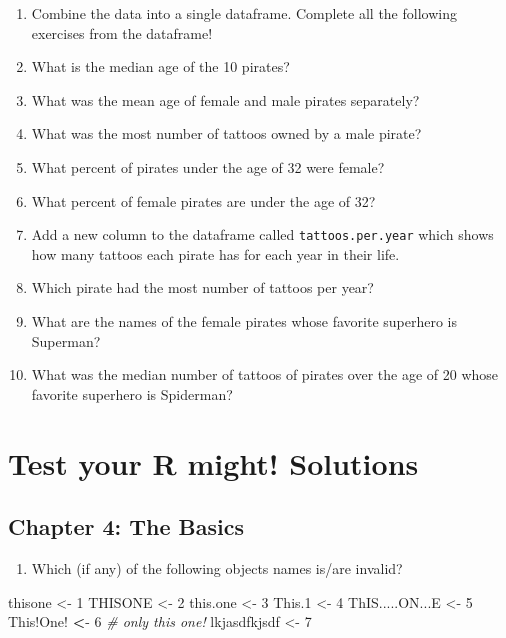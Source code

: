 \documentclass[]{book}
\newenvironment{Shaded}{\begin{snugshade}}{\end{snugshade}}
\newcommand{\DecValTok}[1]{\textcolor[rgb]{0.00,0.00,0.81}{{#1}}}
\newcommand{\FloatTok}[1]{\textcolor[rgb]{0.00,0.00,0.81}{{#1}}}
\newcommand{\StringTok}[1]{\textcolor[rgb]{0.31,0.60,0.02}{{#1}}}
\newcommand{\CommentTok}[1]{\textcolor[rgb]{0.56,0.35,0.01}{\textit{{#1}}}}
\newcommand{\ErrorTok}[1]{\textcolor[rgb]{0.64,0.00,0.00}{\textbf{{#1}}}}
\newcommand{\NormalTok}[1]{{#1}}
\providecommand{\tightlist}{%
  \setlength{\itemsep}{0pt}\setlength{\parskip}{0pt}}
\theoremstyle{definition}
\theoremstyle{definition}
\theoremstyle{remark}
\begin{document}
\begin{enumerate}
\def\labelenumi{\arabic{enumi}.}
\item
  Combine the data into a single dataframe. Complete all the following
  exercises from the dataframe!
\item
  What is the median age of the 10 pirates?
\item
  What was the mean age of female and male pirates separately?
\item
  What was the most number of tattoos owned by a male pirate?
\item
  What percent of pirates under the age of 32 were female?
\item
  What percent of female pirates are under the age of 32?
\item
  Add a new column to the dataframe called \texttt{tattoos.per.year}
  which shows how many tattoos each pirate has for each year in their
  life.
\item
  Which pirate had the most number of tattoos per year?
\item
  What are the names of the female pirates whose favorite superhero is
  Superman?
\item
  What was the median number of tattoos of pirates over the age of 20
  whose favorite superhero is Spiderman?
\end{enumerate}

\chapter{Test your R might!
Solutions}\label{test-your-r-might-solutions}

\section{Chapter 4: The Basics}\label{chapter-4-the-basics}

\begin{enumerate}
\def\labelenumi{\arabic{enumi}.}
\setcounter{enumi}{1}
\tightlist
\item
  Which (if any) of the following objects names is/are invalid?
\end{enumerate}

\begin{Shaded}
\begin{Highlighting}[]
\NormalTok{thisone <-}\StringTok{ }\DecValTok{1}
\NormalTok{THISONE <-}\StringTok{ }\DecValTok{2}
\NormalTok{this.one <-}\StringTok{ }\DecValTok{3}
\NormalTok{This}\FloatTok{.1} \NormalTok{<-}\StringTok{ }\DecValTok{4}
\NormalTok{ThIS.....ON...E <-}\StringTok{ }\DecValTok{5}
\NormalTok{This!One!}\StringTok{ }\ErrorTok{<}\NormalTok{-}\StringTok{ }\DecValTok{6}           \CommentTok{# only this one!}
\NormalTok{lkjasdfkjsdf <-}\StringTok{ }\DecValTok{7}
\end{Highlighting}
\end{Shaded}
\end{document}
